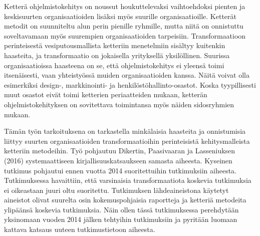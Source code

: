 Ketterä ohjelmistokehitys on noussut houkuttelevaksi vaihtoehdoksi
pienten ja keskisuurten organisaatioiden lisäksi myös suurille
organisaatioille. Ketterät metodit on suunniteltu alun perin
pienille ryhmille, mutta niitä on onnistuttu soveltavamaan myös
suurempien organisaatioiden tarpeisiin. Transformaatioon perinteisestä
vesiputousmallista ketteriin menetelmiin sisältyy kuitenkin haasteita,
ja transformaatio on jokaisella yrityksellä yksilöllinen. Suurissa
organisaatioissa haasteena on se, että ohjelmistokehitys ei yleensä
toimi itsenäisesti, vaan yhteistyössä muiden organisaatioiden
kanssa. Näitä voivat olla esimerkiksi design-, markkinointi- ja
henkilöstöhallinto-osastot. Koska tyypillisesti muut osastot eivät
toimi ketterien periaatteiden mukaan, ketterän ohjelmistokehityksen on
sovitettava toimintansa myös näiden sidosryhmien mukaan.

Tämän työn tarkoituksena on tarkastella minkälaisia haasteita
ja onnistumisia liittyy suurten organisaatioiden transformaatioihin
perinteisistä kehitysmalleista ketteriin metodeihin. Työ pohjautuu
Dikertin, Paasivaaran ja Lasseniuksen (2016) systemaattiseen
kirjallisuuskatsaukseen samasta aiheesta. Kyseinen tutkimus pohjautui
ennen vuotta 2014 suoritettuihin tutkimuksiin aiheesta. Tutkimuksessa
havaittiin, että varsinaisia transformaatiota koskevia tutkimuksia
ei oikeastaan juuri oltu suoritettu. Tutkimuksen lähdeaineistona
käytetyt aineistot olivat suurelta osin kokemuspohjaisia raportteja
ja ketteriä metodeita ylipäänsä koskevia tutkimuksia. Näin ollen
tässä tutkimuksessa perehdytään yksinomaan vuoden 2014 jälken
tehtyihin tutkimuksiin ja pyritään luomaan kattava katsaus uuteen
tutkimustietoon aiheesta.

